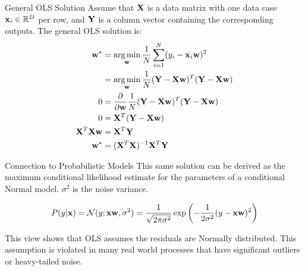 \documentclass[serif,xcolor=pdftex,dvipsnames,table,hyperref={bookmarks=false,breaklinks}]{beamer}
\begin{document}
\begin{frame}[t]{General OLS Solution} 
Assume that ${\mathbf{X}}$ is a data matrix with one data case ${\mathbf{x}}_i\in \mathbb{R}^D$ per row, and ${\mathbf{Y}}$ is 
a column vector containing the corresponding outputs. The general OLS solution is: 
\pause
\begin{align*}
{\mathbf{w}}^* &= \operatorname*{arg\,min}_{{\mathbf{w}}} \frac{1}{N}\sum_{i=1}^N(y_i - {\mathbf{x}}_i{\mathbf{w}})^2\\
          &= \operatorname*{arg\,min}_{{\mathbf{w}}} \frac{1}{N}({\mathbf{Y}} - {\mathbf{X}}{\mathbf{w}})^T({\mathbf{Y}} - {\mathbf{X}}{\mathbf{w}})\\
0          &= \frac{\partial{}}{\partial{{\mathbf{w}}}} \frac{1}{N}({\mathbf{Y}} - {\mathbf{X}}{\mathbf{w}})^T({\mathbf{Y}} - {\mathbf{X}}{\mathbf{w}})\\
0&={\mathbf{X}}^T({\mathbf{Y}} - {\mathbf{X}}{\mathbf{w}}) \\
{\mathbf{X}}^T{\mathbf{X}}{\mathbf{w}} &= {\mathbf{X}}^T{\mathbf{Y}}\\
{\mathbf{w}}^* & = ({\mathbf{X}}^T{\mathbf{X}})^{-1}{\mathbf{X}}^T{\mathbf{Y}}
\end{align*}
\end{frame}

\begin{frame}[t]{Connection to Probabilistic Models} 
This same solution can be derived as the maximum conditional 
likelihood estimate for the parameters of a conditional 
Normal model. $\sigma^2$ is the noise variance.

\pause
\begin{align*}
P(y|{\mathbf{x}}) = \mathcal{N}(y;{\mathbf{x}}{\mathbf{w}}, \sigma^2)
             = \frac{1}{\sqrt{2\pi\sigma^2}}\exp\left(-\frac{1}{2\sigma^2}(y-{\mathbf{x}}{\mathbf{w}})^2\right)
\end{align*}

\pause This view shows that OLS assumes the residuals are Normally distributed.
This assumption is violated in many real world processes that have significant
outliers or heavy-tailed noise.


\end{frame}
\end{document}
